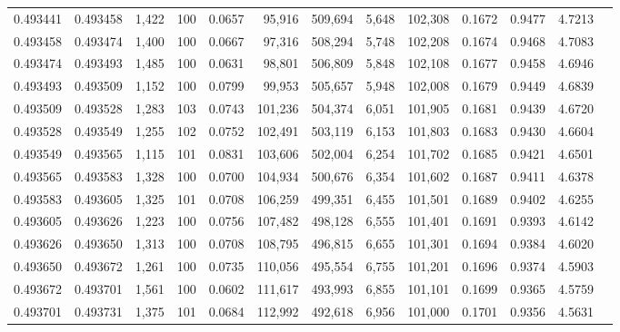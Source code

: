 \begin{tabular}{rrrrrrrrrrrrr}
0.493441 & 0.493458 & 1,422 & 100 &                                     0.0657 &  95,916 & 509,694 &   5,648 & 102,308 & 0.1672 & 0.9477 & 4.7213 \\
0.493458 & 0.493474 & 1,400 & 100 &                                     0.0667 &  97,316 & 508,294 &   5,748 & 102,208 & 0.1674 & 0.9468 & 4.7083 \\
0.493474 & 0.493493 & 1,485 & 100 &                                     0.0631 &  98,801 & 506,809 &   5,848 & 102,108 & 0.1677 & 0.9458 & 4.6946 \\
0.493493 & 0.493509 & 1,152 & 100 &                                     0.0799 &  99,953 & 505,657 &   5,948 & 102,008 & 0.1679 & 0.9449 & 4.6839 \\
0.493509 & 0.493528 & 1,283 & 103 &                                     0.0743 & 101,236 & 504,374 &   6,051 & 101,905 & 0.1681 & 0.9439 & 4.6720 \\
0.493528 & 0.493549 & 1,255 & 102 &                                     0.0752 & 102,491 & 503,119 &   6,153 & 101,803 & 0.1683 & 0.9430 & 4.6604 \\
0.493549 & 0.493565 & 1,115 & 101 &                                     0.0831 & 103,606 & 502,004 &   6,254 & 101,702 & 0.1685 & 0.9421 & 4.6501 \\
0.493565 & 0.493583 & 1,328 & 100 &                                     0.0700 & 104,934 & 500,676 &   6,354 & 101,602 & 0.1687 & 0.9411 & 4.6378 \\
0.493583 & 0.493605 & 1,325 & 101 &                                     0.0708 & 106,259 & 499,351 &   6,455 & 101,501 & 0.1689 & 0.9402 & 4.6255 \\
0.493605 & 0.493626 & 1,223 & 100 &                                     0.0756 & 107,482 & 498,128 &   6,555 & 101,401 & 0.1691 & 0.9393 & 4.6142 \\
0.493626 & 0.493650 & 1,313 & 100 &                                     0.0708 & 108,795 & 496,815 &   6,655 & 101,301 & 0.1694 & 0.9384 & 4.6020 \\
0.493650 & 0.493672 & 1,261 & 100 &                                     0.0735 & 110,056 & 495,554 &   6,755 & 101,201 & 0.1696 & 0.9374 & 4.5903 \\
0.493672 & 0.493701 & 1,561 & 100 &                                     0.0602 & 111,617 & 493,993 &   6,855 & 101,101 & 0.1699 & 0.9365 & 4.5759 \\
0.493701 & 0.493731 & 1,375 & 101 &                                     0.0684 & 112,992 & 492,618 &   6,956 & 101,000 & 0.1701 & 0.9356 & 4.5631 \\

\end{tabular}

